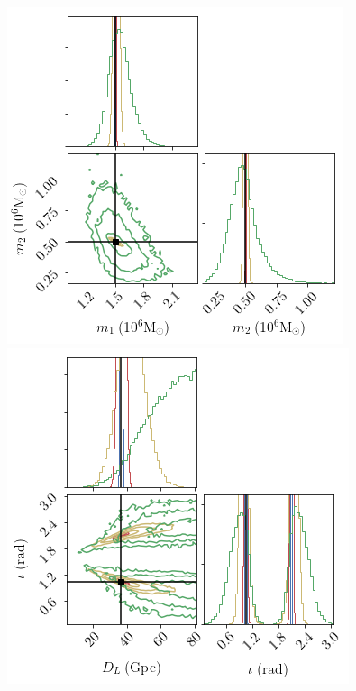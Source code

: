 \documentclass[aps,showpacs,twocolumn,prd,superscriptaddress,nofootinbib]{revtex4-1}
\begin{document}
\begin{figure}
  \centering
  \begin{minipage}{.32\linewidth}
      \includegraphics[width=.99\linewidth]{../plots/corner_smbh_case9_hm_dseries_m1m2.png}
   \end{minipage}
   \begin{minipage}{.32\linewidth}
      \includegraphics[width=.99\linewidth]{../plots/corner_smbh_case9_hm_dseries_Dinc.png}

\end{minipage}
\end{figure}
\end{document}
